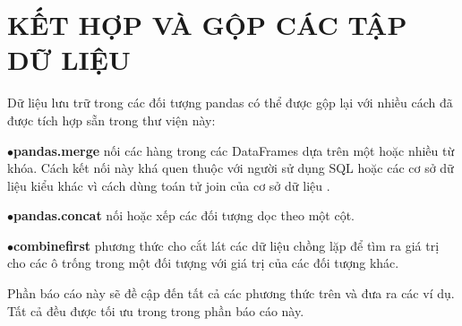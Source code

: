 \chapter{KẾT HỢP VÀ GỘP CÁC TẬP DỮ LIỆU}
\begin{introchap1}
    Dữ liệu lưu trữ trong các đối tượng pandas có thể được gộp lại với nhiều cách đã được tích hợp sẵn trong thư viện này:\par
    \hfill\begin{minipage}{\dimexpr\textwidth-1cm}
\xdef\tpd{\the\prevdepth}
    $\bullet$\textbf{pandas.merge}
   nối các hàng trong các DataFrames dựa trên một hoặc nhiều từ khóa. Cách kết nối này khá quen thuộc với người sử dụng SQL hoặc các cơ sở dữ liệu kiểu khác vì cách dùng toán tử join của cơ sở dữ liệu .\par
   $\bullet$\textbf{pandas.concat}
   nối hoặc xếp các đối tượng dọc theo một cột.\par
   $\bullet$\textbf{combinefirst} 
   phương thức cho cắt lát các dữ liệu chồng lặp để tìm ra giá trị cho các ô trống trong một đối tượng với giá trị của các đối tượng khác.\par
\end{minipage}
    Phần báo cáo này sẽ đề cập đến tất cả các phương thức trên và đưa ra các ví dụ. Tất cả đều được tối ưu trong trong phần báo cáo này.
\end{introchap1}

\sffamily
